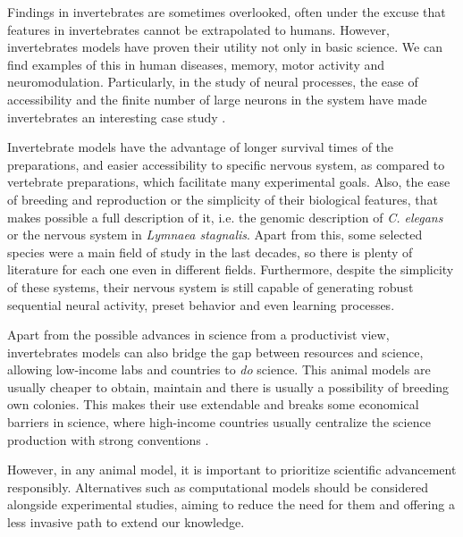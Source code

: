 Findings in invertebrates are sometimes overlooked, often under the excuse that features in invertebrates cannot be extrapolated to humans. However, invertebrates models have proven their utility not only in basic science. We can find examples of this in human diseases, memory, motor activity and neuromodulation. Particularly, in the study of neural processes, the ease of accessibility and the finite number of large neurons in the system have made invertebrates an interesting case study \parencite{gelperin_recent_2019}. 

Invertebrate models have the advantage of longer survival times of the preparations, and easier accessibility to specific nervous system, as compared to vertebrate preparations, which facilitate many experimental goals. Also, the ease of breeding and reproduction or the simplicity of their biological features, that makes possible a full description of it, i.e. the genomic description of \textit{C. elegans} or the nervous system in \textit{Lymnaea stagnalis}. Apart from this, some selected species were a main field of study in the last decades, so there is plenty of literature for each one even in different fields. Furthermore, despite the simplicity of these systems, their nervous system is still capable of generating robust sequential neural activity, preset behavior and even learning processes. 


Apart from the possible advances in science from a productivist view, invertebrates models can also bridge the gap between resources and science, allowing low-income labs and countries to \textit{do} science. This animal models are usually cheaper to obtain, maintain and there is usually a possibility of breeding own colonies. This makes their use extendable and breaks some economical barriers in science, where high-income countries usually centralize the science production with strong conventions \parencite{castillo_spineless_2017,stephan_how_2015}. 


However, in any animal model, it is important to prioritize scientific advancement responsibly. Alternatives such as computational models should be considered alongside experimental studies, aiming to reduce the need for them and offering a less invasive path to extend our knowledge.


